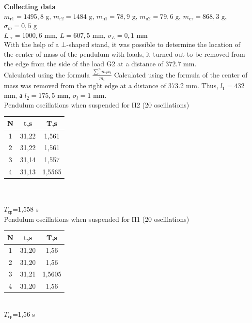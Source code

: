\documentclass[12pt]{article}
\begin{document}
\textbf{\large Collecting data}\\

$m_{\text{г1}}=1495,8$ g, $m_{\text{г2}}=1484$ g, $m_{\text{п1}}=78,9$ g, $m_{\text{п2}}=79,6$ g, $m_{\text{ст}}=868,3$ g, $\sigma_{m}=0,5$ g\\

$L_{\text{ст}}=1000,6$ mm, $L=607,5$ mm, $\sigma_{L}=0,1$ mm\\

With the help of a $\bot$-shaped stand, it was possible to determine the location of the center of mass of the pendulum with loads, it turned out to be removed from the edge from the side of the load G2 at a distance of 372.7 mm.\\

Calculated using the formula \Large $\frac{\sum_{i}^n m_{i}x_{i}}{m_{i}}$ \normalsize Calculated using the formula of the center of mass was removed from the right edge at a distance of 373.2 mm. Thus, $l_{1}=432$ mm, а $l_{2}=175,5$ mm, $\sigma_{l}=1$ mm.\\

Pendulum oscillations when suspended for П2 (20 oscillations)\\

\begin{tabular}{c|c|c}
N & t,s & T,s\\
\hline
 1 & 31,22 & 1,561\\
 2 & 31,22 & 1,561\\
 3 & 31,14 & 1,557\\
 4 & 31,13 & 1,5565\\
\end{tabular}\\
\\

$T_{\text{ср}}$=1,558 s\\


Pendulum oscillations when suspended for П1 (20 oscillations)\\

\begin{tabular}{c|c|c}
N & t,s & T,s\\
\hline
 1 & 31,20 & 1,56\\
 2 & 31,20 & 1,56\\
 3 & 31,21 & 1,5605\\
 4 & 31,20 & 1,56\\
\end{tabular}\\

$T_{\text{ср}}$=1,56 s\\
\end{document}
